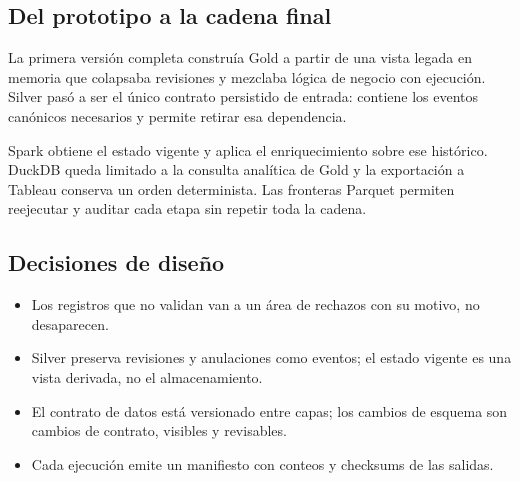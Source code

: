 \documentclass[11pt,a4paper]{article}
\begin{document}
\subsection{Del prototipo a la cadena final}

La primera versión completa construía Gold a partir de una vista legada en
memoria que colapsaba revisiones y mezclaba lógica de negocio con ejecución.
Silver pasó a ser el único contrato persistido de entrada: contiene los
eventos canónicos necesarios y permite retirar esa dependencia.

Spark obtiene el estado vigente y aplica el enriquecimiento sobre ese
histórico. DuckDB queda limitado a la consulta analítica de Gold y la
exportación a Tableau conserva un orden determinista. Las fronteras Parquet
permiten reejecutar y auditar cada etapa sin repetir toda la cadena.

\subsection{Decisiones de diseño}

\begin{itemize}
  \item Los registros que no validan van a
        un área de rechazos con su motivo, no desaparecen.
  \item Silver preserva revisiones y anulaciones como
        eventos; el estado vigente es una vista derivada, no el almacenamiento.
  \item El contrato de datos está versionado entre capas; los cambios de esquema
        son cambios de contrato, visibles y revisables.
  \item Cada ejecución emite un manifiesto con
        conteos y checksums de las salidas.
\end{itemize}
\end{document}
